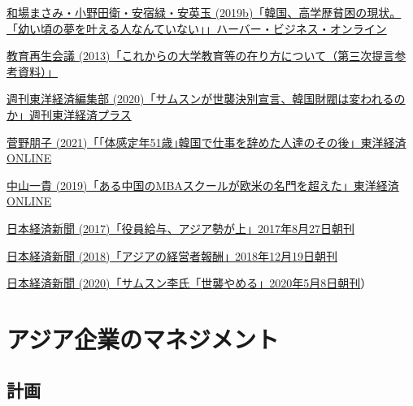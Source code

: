 \documentclass[
]{book}
\begin{document}
\href{https://hbol.jp/pc/189810/}{和場まさみ・小野田衛・安宿緑・安英玉 (2019b)「韓国、高学歴貧困の現状。「幼い頃の夢を叶える人なんていない」」ハーバー・ビジネス・オンライン}

\href{https://www.kantei.go.jp/jp/singi/kyouikusaisei/pdf/dai3_2.pdf}{教育再生会議 (2013)「これからの大学教育等の在り方について（第三次提言参考資料）」}

\href{https://premium.toyokeizai.net/articles/-/23886}{週刊東洋経済編集部 (2020)「サムスンが世襲決別宣言、韓国財閥は変われるのか」週刊東洋経済プラス}

\href{https://toyokeizai.net/articles/-/473559}{菅野朋子 (2021)「｢体感定年51歳｣韓国で仕事を辞めた人達のその後」東洋経済ONLINE}

\href{https://toyokeizai.net/articles/-/278811}{中山一貴 (2019)「ある中国のMBAスクールが欧米の名門を超えた」東洋経済ONLINE}

\href{https://www.nikkei.com/article/DGXKASDZ04H4N_V10C17A8MM8000/}{日本経済新聞 (2017)「役員給与、アジア勢が上」2017年8月27日朝刊}

\href{https://www.nikkei.com/article/DGXMZO39094070Y8A211C1FFE000/}{日本経済新聞 (2018)「アジアの経営者報酬」2018年12月19日朝刊}

\href{https://www.nikkei.com/article/DGXMZO58842290X00C20A5FFJ000/?n_cid=SPTMG002}{日本経済新聞 (2020)「サムスン李氏「世襲やめる」2020年5月8日朝刊}）

\hypertarget{asia-management}{%
\section{アジア企業のマネジメント}\label{asia-management}}

\hypertarget{asia-plan}{%
\subsection{計画}\label{asia-plan}}
\end{document}
